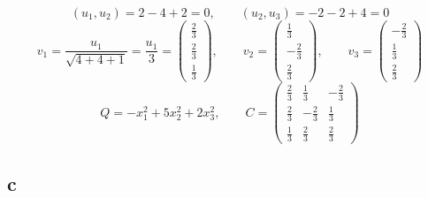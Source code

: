 $$ (u_1, u_2) = 2 - 4 + 2 = 0, \qquad (u_2, u_3) = -2 - 2 + 4 = 0 $$
$$ v_1 = \frac{u_1}{\sqrt{4 + 4 + 1}} = \frac{u_1}{3} =
\begin{pmatrix}
	\frac23 \\
    \frac23 \\
    \frac13
\end{pmatrix}, \qquad v_2 =
\begin{pmatrix}
	\frac13 \\
    -\frac23 \\
    \frac23
\end{pmatrix}, \qquad v_3 =
\begin{pmatrix}
	-\frac23 \\
    \frac13 \\
    \frac23
\end{pmatrix} $$
$$ Q = -x_1^2 + 5x_2^2 + 2x_3^2, \qquad C =
\begin{pmatrix}
	\frac23 & \frac13 & -\frac23 \\
    \frac23 & -\frac23 & \frac13 \\
    \frac13 & \frac23 & \frac23
\end{pmatrix} $$

\subsection{c}

